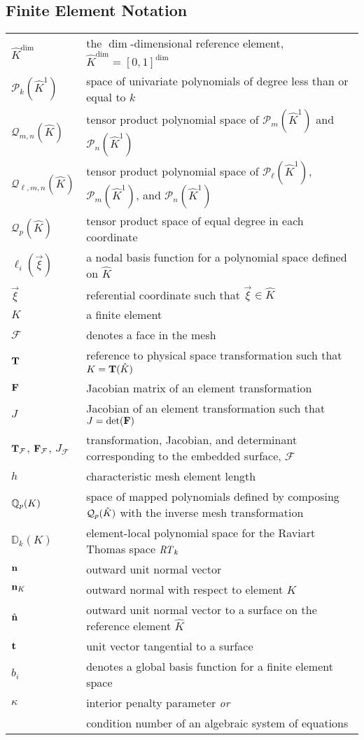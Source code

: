 \documentclass[../doc.tex]{subfiles}
\begin{document}
\subsection*{Finite Element Notation}
\begin{longtable}{p{2.25cm}p{12cm}}
$\hat{K}^{\dim}$ & the $\dim$-dimensional reference element, $\hat{K}^{\dim} = [0,1]^{\dim}$ \\
$\mathcal{P}_k(\hat{K}^1)$ & space of univariate polynomials of degree less than or equal to $k$ \\
$\mathcal{Q}_{m,n}(\hat{K})$ & tensor product polynomial space of $\mathcal{P}_m(\hat{K}^1)$ and $\mathcal{P}_n(\hat{K}^1)$ \\
$\mathcal{Q}_{\ell,m,n}(\hat{K})$ & tensor product polynomial space of $\mathcal{P}_\ell(\hat{K}^1)$, $\mathcal{P}_m(\hat{K}^1)$, and $\mathcal{P}_n(\hat{K}^1)$ \\
$\mathcal{Q}_p(\hat{K})$ & tensor product space of equal degree in each coordinate \\ 
$\ell_i(\vec{\xi})$ & a nodal basis function for a polynomial space defined on $\hat{K}$ \\
$\vec{\xi}$ & referential coordinate such that $\vec{\xi} \in \hat{K}$ \\
$K$ & a finite element \\
$\mathcal{F}$ & denotes a face in the mesh \\
$\boldsymbol{\mathrm{T}}$ & reference to physical space transformation such that $K = \boldsymbol{\mathrm{T}}(\hat{K})$ \\
$\boldsymbol{\mathrm{F}}$ & Jacobian matrix of an element transformation \\
$J$ & Jacobian of an element transformation such that $J = \det(\boldsymbol{\mathrm{F}})$ \\
{$\boldsymbol{\mathrm{T}}_\mathcal{F}$, $\boldsymbol{\mathrm{F}}_\mathcal{F}$, $J_\mathcal{F}$} & transformation, Jacobian, and determinant corresponding to the embedded surface, $\mathcal{F}$ \\
$h$ & characteristic mesh element length \\
$\mathbb{Q}_{p}(K)$ & space of mapped polynomials defined by composing $\mathcal{Q}_{p}(\hat{K})$ with the inverse mesh transformation \\
$\mathbb{D}_k(K)$ & element-local polynomial space for the Raviart Thomas space $\mathit{RT}_k$ \\
$\boldsymbol{\mathrm{n}}$ & outward unit normal vector \\ 
$\boldsymbol{\mathrm{n}}_K$ & outward normal with respect to element $K$ \\
$\hat{\boldsymbol{\mathrm{n}}}$ & outward unit normal vector to a surface on the reference element $\hat{K}$ \\
$\boldsymbol{\mathrm{t}}$ & unit vector tangential to a surface \\
$b_i$ & denotes a global basis function for a finite element space \\
$\kappa$ & interior penalty parameter \emph{or} \\ 
& condition number of an algebraic system of equations \\


\end{longtable}
\end{document}

